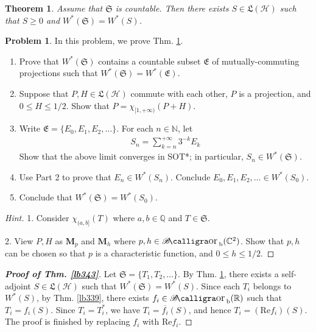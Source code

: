 \documentclass[12pt,b5paper,notitlepage]{article}
\theoremstyle{definition}
\newtheorem{prob}{\color{red}Problem}[section]
\theoremstyle{plain}
\newtheorem{thm}[df]{Theorem}
\DeclareMathOperator{\Borb}{{\mathscr{B}\text{\kern -2pt {\calligra\large or}}\,}_{\mathrm b}}
\newcommand{\fk}{\mathfrak}
\newcommand{\ovl}{\overline}
\newcommand{\Cbb}{\mathbb C}
\newcommand{\Nbb}{\mathbb N}
\newcommand{\Qbb}{\mathbb Q}
\newcommand{\Rbb}{\mathbb R}
\newcommand{\Real}{\mathrm{Re}}
\newcommand{\MH}{\mathcal H}
\newcommand{\Mbf}{\mathbf M}
\numberwithin{equation}{section}
\begin{document}
\begin{thm}\label{lb342}
Assume that $\fk S$ is countable. Then there exists $S\in \fk L(\MH)$ such that $S\geq0$ and $W^*(\fk S)=W^*(S)$.
\end{thm}

\begin{prob}
In this problem, we prove Thm. \ref{lb342}.
\begin{enumerate}
\item Prove that $W^*(\fk S)$ contains a countable subset $\fk E$ of mutually-commuting projections such that $W^*(\fk S)=W^*(\fk E)$.
\item Suppose that $P,H\in\fk L(\MH)$ commute with each other, $P$ is a projection, and $0\leq H\leq 1/2$. Show that $P=\chi_{[1,+\infty)}(P+H)$.
\item Write $\fk E=\{E_0,E_1,E_2,\dots\}$. For each $n\in\Nbb$, let
\begin{align*}
S_n=\sum_{k=n}^{+\infty} 3^{-k}E_k
\end{align*}
Show that the above limit converges in SOT*; in particular, $S_n\in W^*(\fk S)$.
\item Use Part 2 to prove that $E_n\in W^*(S_n)$. Conclude $E_0,E_1,E_2,\dots\in W^*(S_0)$.
\item Conclude that $W^*(\fk S)=W^*(S_0)$.
\end{enumerate}
\end{prob}

\begin{proof}[Hint]
1. Consider $\chi_{(a,b]}(T)$ where $a,b\in\Qbb$ and $T\in\fk S$.

2. View $P,H$ as $\Mbf_p$ and $\Mbf_h$ where $p,h\in\Borb(\Cbb^2)$. Show that $p,h$ can be chosen so that $p$ is a characteristic function, and $0\leq h\leq 1/2$.
\end{proof}


\begin{proof}[\textbf{Proof of Thm. \ref{lb343}}]
Let $\fk S=\{T_1,T_2,\dots\}$. By Thm. \ref{lb342}, there exists a self-adjoint $S\in\fk L(\MH)$ such that $W^*(\fk S)=W^*(S)$. Since each $T_i$ belongs to $W^*(S)$, by Thm. \ref{lb339}, there exists $f_i\in\Borb(\Rbb)$ such that $T_i=f_i(S)$. Since $T_i=T_i^*$, we have $T_i=\ovl{f_i}(S)$, and hence $T_i=(\Real f_i)(S)$. The proof is finished by replacing $f_i$ with $\Real f_i$.
\end{proof}








\newpage
\end{document}
